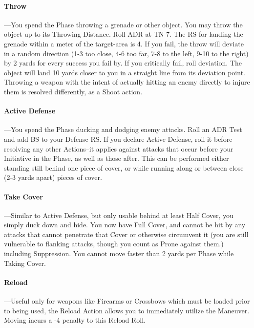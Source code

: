 \documentclass[oneside,11pt,english]{book}
\begin{document}
\paragraph{Throw}---\quad You spend the Phase throwing a grenade or other object. You may throw the object up to its
Throwing Distance. Roll ADR at TN 7. The RS for landing the grenade within a meter of the target-area
is 4. If you fail, the throw will deviate in a random direction (1-3 too close, 4-6 too far, 7-8 to the left,
9-10 to the right) by 2 yards for every success you fail by. If you critically fail, roll deviation. The object
will land 10 yards closer to you in a straight line from its deviation point.
Throwing a weapon with the intent of actually hitting an enemy directly to injure them is resolved
differently, as a Shoot action.

\paragraph{\label{par:Active Defense:} Active Defense}---\quad You spend the Phase ducking and dodging enemy attacks. Roll an ADR Test and add BS
to your Defense RS. If you declare Active Defense, roll it before resolving any other Actions--it applies
against attacks that occur before your Initiative in the Phase, as well as those after. This can be performed
either standing still behind one piece of cover, or while running along or between close (2-3 yards apart)
pieces of cover.

\paragraph{\label{par:Take Cover} Take Cover}---\quad Similar to Active Defense, but only usable behind at least Half Cover, you simply duck down and hide. You now have Full Cover, and cannot be hit by any attacks that cannot penetrate that
Cover or otherwise circumvent it (you are still vulnerable to flanking attacks, though you count as Prone
against them.) including Suppression. You cannot move faster than 2 yards per Phase while Taking
Cover.

\paragraph{\label{par:Reload}Reload}---\quad Useful only for weapons like Firearms or Crossbows which must be loaded prior to being used, the Reload Action allows you to immediately utilize the  Maneuver. Moving incurs a -4 penalty to this Reload Roll.
\end{document}
